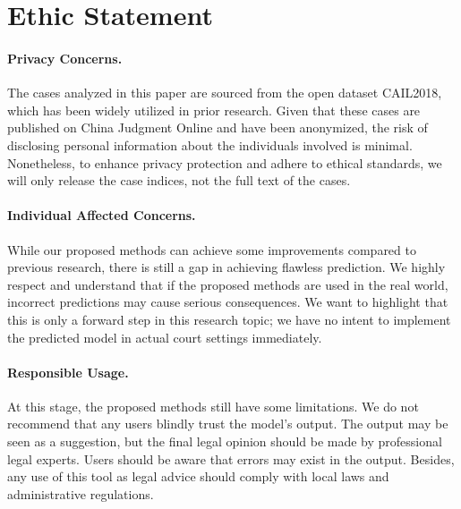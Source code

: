\section*{Ethic Statement}
\paragraph{Privacy Concerns.} The cases analyzed in this paper are sourced from the open dataset CAIL2018, which has been widely utilized in prior research. Given that these cases are published on China Judgment Online and have been anonymized, the risk of disclosing personal information about the individuals involved is minimal. Nonetheless, to enhance privacy protection and adhere to ethical standards, we will only release the case indices, not the full text of the cases.

\paragraph{Individual Affected Concerns.} While our proposed methods can achieve some improvements compared to previous research, there is still a gap in achieving flawless prediction. We highly respect and understand that if the proposed methods are used in the real world, incorrect predictions may cause serious consequences. We want to highlight that this is only a forward step in this research topic; we have no intent to implement the predicted model in actual court settings immediately. 

\paragraph{Responsible Usage.} At this stage, the proposed methods still have some limitations. We do not recommend that any users blindly trust the model's output. The output may be seen as a suggestion, but the final legal opinion should be made by professional legal experts. Users should be aware that errors may exist in the output. Besides, any use of this tool as legal advice should comply with local laws and administrative regulations.
